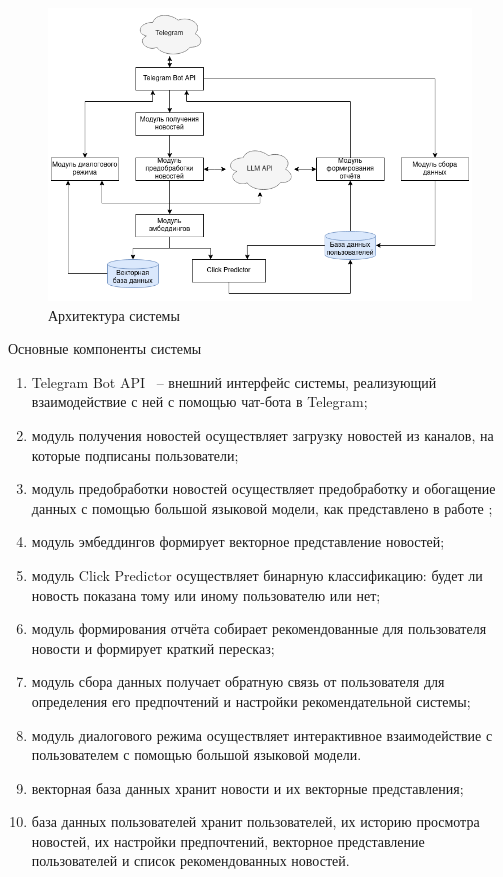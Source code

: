 \begin{figure}[h]
    \centering
    \includegraphics[width=\linewidth]{../images/system_architecture.drawio.png}
    \caption{Архитектура системы}
    \label{img:system_architecture}
\end{figure}

Основные компоненты системы
\begin{enumerate}
    \item Telegram Bot API ~-- внешний интерфейс системы, реализующий взаимодействие с ней с помощью чат-бота в Telegram;
    \item модуль получения новостей осуществляет загрузку новостей из каналов, на которые подписаны пользователи;
    \item модуль предобработки новостей осуществляет предобработку и обогащение данных с помощью большой языковой модели, как представлено в работе \cite{news_rec_gen};
    \item модуль эмбеддингов формирует векторное представление новостей;
    \item модуль Click Predictor осуществляет бинарную классификацию: будет ли новость показана тому или иному пользователю или нет;
    \item модуль формирования отчёта собирает рекомендованные для пользователя новости и формирует краткий пересказ;
    \item модуль сбора данных получает обратную связь от пользователя для определения его предпочтений и настройки рекомендательной системы;
    \item модуль диалогового режима осуществляет интерактивное взаимодействие с пользователем с помощью большой языковой модели.
    \item векторная база данных хранит новости и их векторные представления;
    \item база данных пользователей хранит пользователей, их историю просмотра новостей, их настройки предпочтений, векторное представление пользователей и список рекомендованных новостей.
\end{enumerate}

